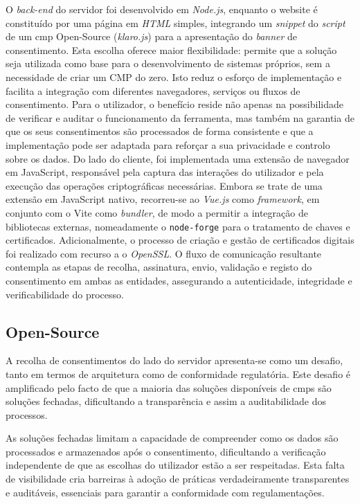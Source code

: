 O \textit{back-end} do servidor foi desenvolvido em \textit{Node.js}, enquanto o website é constituído por uma página em \textit{HTML} simples, integrando um \textit{snippet} do \textit{script} de um \acrshort{cmp} Open-Source (\textit{klaro.js}) para a apresentação do \textit{banner} de consentimento.
Esta escolha oferece maior flexibilidade: permite que a solução seja utilizada como base para o desenvolvimento de sistemas próprios, sem a necessidade de criar um CMP do zero. Isto reduz o esforço de implementação e facilita a integração com diferentes navegadores, serviços ou fluxos de consentimento. Para o utilizador, o benefício reside não apenas na possibilidade de verificar e auditar o funcionamento da ferramenta, mas também na garantia de que os seus consentimentos são processados de forma consistente e que a implementação pode ser adaptada para reforçar a sua privacidade e controlo sobre os dados.
Do lado do cliente, foi implementada uma extensão de navegador em JavaScript, responsável pela captura das interações do utilizador e pela execução das operações criptográficas necessárias. Embora se trate de uma extensão em JavaScript nativo, recorreu-se ao \textit{Vue.js} como \textit{framework}, em conjunto com o Vite como \textit{bundler}, de modo a permitir a integração de bibliotecas externas, nomeadamente o \texttt{node-forge} para o tratamento de chaves e certificados. Adicionalmente, o processo de criação e gestão de certificados digitais foi realizado com recurso a o \textit{OpenSSL}. O fluxo de comunicação resultante contempla as etapas de recolha, assinatura, envio, validação e registo do consentimento em ambas as entidades, assegurando a autenticidade, integridade e verificabilidade do processo.

\subsection{Open-Source}

A recolha de consentimentos do lado do servidor apresenta-se como um desafio, tanto em termos de arquitetura como de conformidade regulatória. Este desafio é amplificado pelo facto de que a maioria das soluções disponíveis de \acrshort{cmp}s são soluções fechadas, dificultando a transparência e assim a auditabilidade dos processos.

As soluções fechadas limitam a capacidade de compreender como os dados são processados e armazenados após o consentimento, dificultando a verificação independente de que as escolhas do utilizador estão a ser respeitadas. Esta falta de visibilidade cria barreiras à adoção de práticas verdadeiramente transparentes e auditáveis, essenciais para garantir a conformidade com regulamentações.

